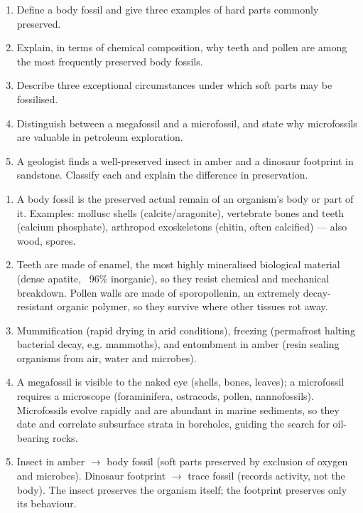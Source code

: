\documentclass[11pt]{article}
\begin{document}
\begin{exercice}
\begin{enumerate}
\item Define a body fossil and give three examples of hard parts commonly preserved.
\item Explain, in terms of chemical composition, why teeth and pollen are among the most frequently preserved body fossils.
\item Describe three exceptional circumstances under which soft parts may be fossilised.
\item Distinguish between a megafossil and a microfossil, and state why microfossils are valuable in petroleum exploration.
\item A geologist finds a well-preserved insect in amber and a dinosaur footprint in sandstone. Classify each and explain the difference in preservation.
\end{enumerate}
\end{exercice}

\begin{corrige}
\begin{enumerate}
\item A body fossil is the preserved actual remain of an organism's body or part of it. Examples: mollusc shells (calcite/aragonite), vertebrate bones and teeth (calcium phosphate), arthropod exoskeletons (chitin, often calcified) — also wood, spores.
\item Teeth are made of enamel, the most highly mineralised biological material (dense apatite, ~96\% inorganic), so they resist chemical and mechanical breakdown. Pollen walls are made of sporopollenin, an extremely decay-resistant organic polymer, so they survive where other tissues rot away.
\item Mummification (rapid drying in arid conditions), freezing (permafrost halting bacterial decay, e.g. mammoths), and entombment in amber (resin sealing organisms from air, water and microbes).
\item A megafossil is visible to the naked eye (shells, bones, leaves); a microfossil requires a microscope (foraminifera, ostracods, pollen, nannofossils). Microfossils evolve rapidly and are abundant in marine sediments, so they date and correlate subsurface strata in boreholes, guiding the search for oil-bearing rocks.
\item Insect in amber $\rightarrow$ body fossil (soft parts preserved by exclusion of oxygen and microbes). Dinosaur footprint $\rightarrow$ trace fossil (records activity, not the body). The insect preserves the organism itself; the footprint preserves only its behaviour.
\end{enumerate}
\end{corrige}
\end{document}
